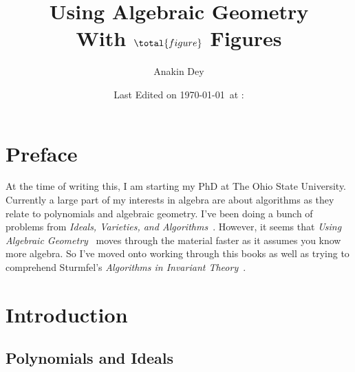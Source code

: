 \documentclass[letterpaper, 11pt, oneside]{book}
\title{\vspace{-100pt} {\Huge Using Algebraic Geometry} \\ {\small With $\total{figure}$ Figures}}
\author{\Large Anakin Dey}
\date{\small Last Edited on \today\ at \DTMfetchhour{now}:\DTMfetchminute{now}}
\newcommand{\CoverName}{Cover}
\begin{document}
\frontmatter
\renewcommand{\thepage}{\CoverName}
\maketitle


\tableofcontents
\clearpage


%

\chapter*{Preface}

At the time of writing this, I am starting my PhD at The Ohio State University.
Currently a large part of my interests in algebra are about algorithms as they relate to polynomials and algebraic geometry.
I've been doing a bunch of problems from \emph{Ideals, Varieties, and Algorithms}~\cite{book:IVA}.
However,  it seems that \emph{Using Algebraic Geometry}~\cite{book:UAG} moves through the material faster as it assumes you know more algebra.
So I've moved onto working through this books as well as trying to comprehend Sturmfel's \emph{Algorithms in Invariant Theory}~\cite{book:AlgosInInvTheory}.

\mainmatter

\chapter{Introduction}

\section*{Polynomials and Ideals}


\printbibliography
\end{document}
